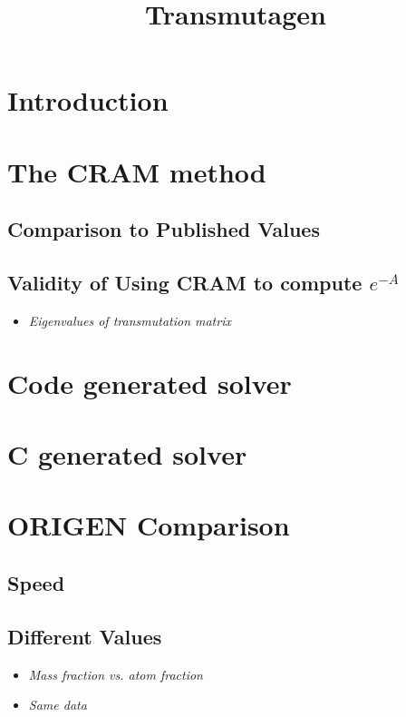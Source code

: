 \documentclass{article}
\title{Transmutagen}
\begin{document}
\flushbottom
\maketitle
\thispagestyle{empty}

\begin{abstract}

\end{abstract}


\section{Introduction}

\section{The CRAM method}
\label{sec:cram-method}


\subsection{Comparison to Published Values}
\subsection{Validity of Using CRAM to compute $e^{-A}$}
\begin{itemize}
\item \it{Eigenvalues of transmutation matrix}
\end{itemize}

\section{Code generated solver}
\label{sec:lambdify-solve}


\section{C generated solver}
\label{sec:c-solve}


\section{ORIGEN Comparison}
\subsection{Speed}
\subsection{Different Values}
\begin{itemize}
\item \it{Mass fraction vs. atom fraction}
\item \it{Same data}
\end{itemize}
\end{document}
